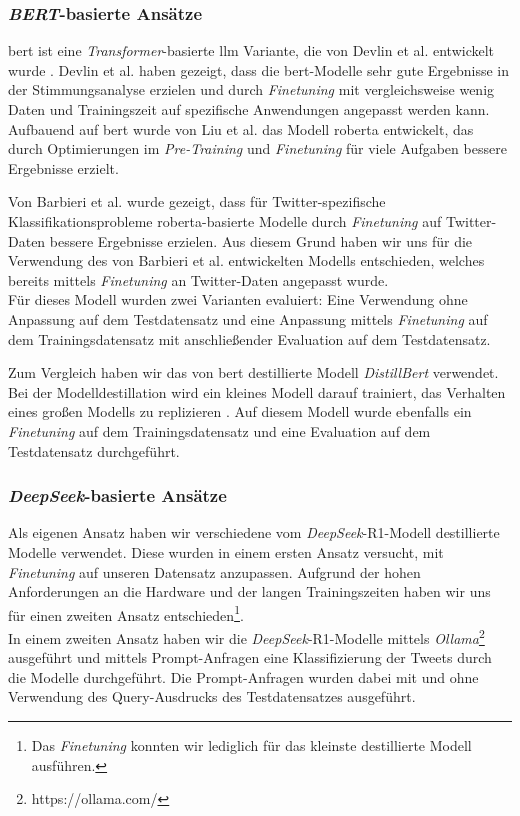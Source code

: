 \subsubsection{\textit{BERT}-basierte Ansätze}\label{subsec:bert}

\gls{bert} ist eine \textit{Transformer}-basierte \gls{llm} Variante, die von Devlin et al. entwickelt wurde \cite{devlin2018bert}.
Devlin et al. haben gezeigt, dass die \gls{bert}-Modelle sehr gute Ergebnisse in der Stimmungsanalyse erzielen und durch \textit{Finetuning} mit vergleichsweise wenig Daten und Trainingszeit auf spezifische Anwendungen angepasst werden kann.
Aufbauend auf \gls{bert} wurde von Liu et al. \cite{liu2019roberta} das Modell \gls{roberta} entwickelt, das durch Optimierungen im \textit{Pre-Training} und \textit{Finetuning} für viele Aufgaben bessere Ergebnisse erzielt.

Von Barbieri et al. \cite{barbieri2020tweeteval} wurde gezeigt, dass für Twitter-spezifische Klassifikationsprobleme \gls{roberta}-basierte Modelle durch \textit{Finetuning} auf Twitter-Daten bessere Ergebnisse erzielen.
Aus diesem Grund haben wir uns für die Verwendung des von Barbieri et al. entwickelten Modells entschieden, welches bereits mittels \textit{Finetuning} an Twitter-Daten angepasst wurde.\\
Für dieses Modell wurden zwei Varianten evaluiert: Eine Verwendung ohne Anpassung auf dem Testdatensatz und eine Anpassung mittels \textit{Finetuning} auf dem Trainingsdatensatz mit anschließender Evaluation auf dem Testdatensatz.

Zum Vergleich haben wir das von \gls{bert} destillierte Modell \textit{DistillBert} \cite{sanh2019distilbert} verwendet.
Bei der Modelldestillation wird ein kleines Modell darauf trainiert, das Verhalten eines großen Modells zu replizieren \cite{sanh2019distilbert}.
Auf diesem Modell wurde ebenfalls ein \textit{Finetuning} auf dem Trainingsdatensatz und eine Evaluation auf dem Testdatensatz durchgeführt.


\subsubsection{\textit{DeepSeek}-basierte Ansätze}\label{subsec:deepseek}

Als eigenen Ansatz haben wir verschiedene vom \textit{DeepSeek}-R1-Modell destillierte Modelle \cite{deepseekai2025deepseekr1incentivizingreasoningcapability} verwendet.
Diese wurden in einem ersten Ansatz versucht, mit \textit{Finetuning} auf unseren Datensatz anzupassen.
Aufgrund der hohen Anforderungen an die Hardware und der langen Trainingszeiten haben wir uns für einen zweiten Ansatz entschieden\footnote{Das \textit{Finetuning} konnten wir lediglich für das kleinste destillierte Modell ausführen.}.\\
In einem zweiten Ansatz haben wir die \textit{DeepSeek}-R1-Modelle mittels \textit{Ollama}\footnote{https://ollama.com/} ausgeführt und mittels Prompt-Anfragen eine Klassifizierung der Tweets durch die Modelle durchgeführt.
Die Prompt-Anfragen wurden dabei mit und ohne Verwendung des Query-Ausdrucks des Testdatensatzes ausgeführt.
